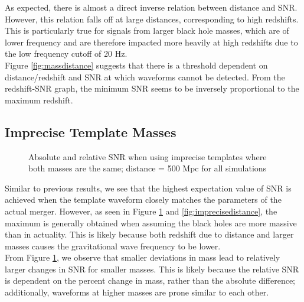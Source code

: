 \documentclass{article}
\begin{document}
As expected, there is almost a direct inverse relation between distance and SNR. However, this relation falls off at large distances, corresponding to high redshifts. This is particularly true for signals from larger black hole masses, which are of lower frequency and are therefore impacted more heavily at high redshifts due to the low frequency cutoff of 20 Hz. \\

Figure \ref{fig:massdistance} suggests that there is a threshold dependent on distance/redshift and SNR at which waveforms cannot be detected. From the redshift-SNR graph, the minimum SNR seems to be inversely proportional to the maximum redshift. 

\subsection{Imprecise Template Masses}

\begin{figure}[!htb]
    \caption{\label{fig:imprecisemass} Absolute and relative SNR when using imprecise templates where both masses are the same; distance = 500 Mpc for all simulations}
\end{figure}

Similar to previous results, we see that the highest expectation value of SNR is achieved when the template waveform closely matches the parameters of the actual merger. However, as seen in Figure \ref{fig:imprecisemass} and \ref{fig:imprecisedistance}, the maximum is generally obtained when assuming the black holes are more massive than in actuality. This is likely because both redshift due to distance and larger masses causes the gravitational wave frequency to be lower. \\
 
From Figure \ref{fig:imprecisemass}, we observe that smaller deviations in mass lead to relatively larger changes in SNR for smaller masses. This is likely because the relative SNR is dependent on the percent change in mass, rather than the absolute difference; additionally, waveforms at higher masses are prone similar to each other.
\end{document}
